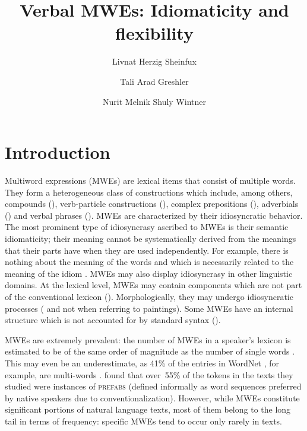 \documentclass[output=paper]{langsci/langscibook}
\title{Verbal MWEs: Idiomaticity and flexibility}
\author{%
 Livnat Herzig Sheinfux\affiliation{University of Haifa}\and
 Tali Arad Greshler\affiliation{University of Haifa}\and
 Nurit Melnik\affiliation{The Open University of Israel}\lastand
 Shuly Wintner\affiliation{University of Haifa}
}
\begin{document}
\section{Introduction}
\label{sec:introduction}

Multiword expressions (MWEs) are lexical items that consist of
multiple words. They form a heterogeneous class of
constructions which include, among others, compounds (), verb-particle constructions (), complex
prepositions (), adverbials ()
and verbal phrases (). MWEs are characterized
by their idiosyncratic behavior. The most prominent type of
idiosyncrasy ascribed to MWEs is their semantic idiomaticity; their
meaning cannot be systematically derived from the meanings that their
parts have when they are used independently.
For example, there is nothing about the meaning of the words  and  which is necessarily related to the meaning of the idiom .
MWEs may also display idiosyncrasy in other linguistic
domains. At the lexical level, MWEs may contain components which are
not part of the conventional lexicon (). Morphologically, they may undergo idiosyncratic processes
( and not  when referring to
paintings). Some MWEs have an internal structure which is not
accounted for by standard syntax ().

MWEs are extremely prevalent: the number of MWEs in a speaker's
lexicon is estimated to be of the same order of magnitude as the
number of single words \citep{jackendoff1997architecture}. This may even be an
underestimate, as 41\% of the entries in WordNet \citep{wordnet}, for
example, are multi-words \citep{sag02}.
\citet{erman:warren:2000} found that over~55\% of the tokens in the
texts they studied were instances of {\scshape prefabs} (defined
informally as word sequences preferred by native speakers due to
conventionalization).  However, while MWEs constitute significant
portions of natural language texts, most of them belong to the long
tail in terms of frequency: specific MWEs tend to occur only rarely in
texts.
\end{document}
